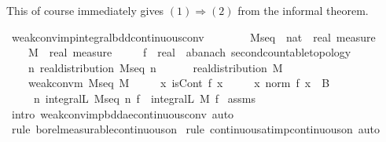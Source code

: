 \documentclass{article}
\theoremstyle{definition}
\begin{document}
\medskip

This of course immediately gives $(1) \Longrightarrow (2)$ from the informal theorem.

\medskip

\begin{isabellebody}
\isamarkupfalse%
\ weak{\isacharunderscore}conv{\isacharunderscore}imp{\isacharunderscore}integral{\isacharunderscore}bdd{\isacharunderscore}continuous{\isacharunderscore}conv{\isacharcolon}\isanewline
\ \ \ \isanewline
\ \ \ \ M{\isacharunderscore}seq\ {\isacharcolon}{\isacharcolon}\ {\isachardoublequoteopen}nat\ {\isasymRightarrow}\ real\ measure{\isachardoublequoteclose}\ \isanewline
\ \ \ \ M\ {\isacharcolon}{\isacharcolon}\ {\isachardoublequoteopen}real\ measure{\isachardoublequoteclose}\ \isanewline
\ \ \ \ f\ {\isacharcolon}{\isacharcolon}\ {\isachardoublequoteopen}real\ {\isasymRightarrow}\ {\isacharprime}a{\isacharcolon}{\isacharcolon}{\isacharbraceleft}banach{\isacharcomma}\ second{\isacharunderscore}countable{\isacharunderscore}topology{\isacharbraceright}{\isachardoublequoteclose}\isanewline
\ \ \ \isanewline
\ \ \ \ {\isachardoublequoteopen}{\isasymAnd}n{\isachardot}\ real{\isacharunderscore}distribution\ {\isacharparenleft}M{\isacharunderscore}seq\ n{\isacharparenright}{\isachardoublequoteclose}\ \ \isanewline
\ \ \ \ {\isachardoublequoteopen}real{\isacharunderscore}distribution\ M{\isachardoublequoteclose}\ \ \isanewline
\ \ \ \ {\isachardoublequoteopen}weak{\isacharunderscore}conv{\isacharunderscore}m\ M{\isacharunderscore}seq\ M{\isachardoublequoteclose}\ \isanewline
\ \ \ \ {\isachardoublequoteopen}{\isasymAnd}x{\isachardot}\ isCont\ f\ x{\isachardoublequoteclose}\ \isanewline
\ \ \ \ {\isachardoublequoteopen}{\isasymAnd}x{\isachardot}\ norm\ {\isacharparenleft}f\ x{\isacharparenright}\ {\isasymle}\ B{\isachardoublequoteclose}\isanewline
\ \ \ \isanewline
\ \ \ \ {\isachardoublequoteopen}{\isacharparenleft}{\isasymlambda}\ n{\isachardot}\ integral\isactrlsup L\ {\isacharparenleft}M{\isacharunderscore}seq\ n{\isacharparenright}\ f{\isacharparenright}\ {\isacharminus}{\isacharminus}{\isacharminus}{\isacharminus}{\isachargreater}\ integral\isactrlsup L\ M\ f{\isachardoublequoteclose}\isanewline
{}\isamarkupfalse%
\ assms\ \isamarkupfalse%
\ {\isacharparenleft}intro\ weak{\isacharunderscore}conv{\isacharunderscore}imp{\isacharunderscore}bdd{\isacharunderscore}ae{\isacharunderscore}continuous{\isacharunderscore}conv{\isacharcomma}\ auto{\isacharparenright}\isanewline
\ \ \isamarkupfalse%
\ {\isacharparenleft}rule\ borel{\isacharunderscore}measurable{\isacharunderscore}continuous{\isacharunderscore}on{}{\isacharparenright}\isanewline
{}\isamarkupfalse%
\ {\isacharparenleft}rule\ continuous{\isacharunderscore}at{\isacharunderscore}imp{\isacharunderscore}continuous{\isacharunderscore}on{\isacharcomma}\ auto{\isacharparenright}%
\end{isabellebody}
\end{document}
